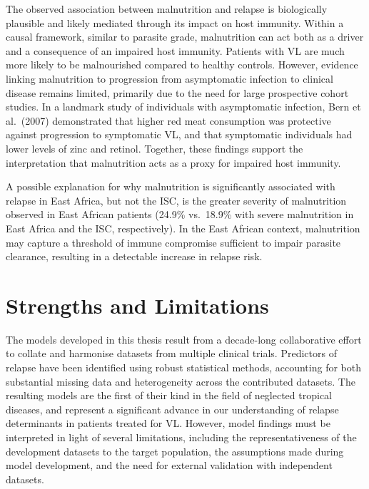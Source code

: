 The observed association between malnutrition and relapse is biologically plausible and likely mediated through its impact on host immunity. Within a causal framework, similar to parasite grade, malnutrition can act both as a driver and a consequence of an impaired host immunity\cite{bourke2016}. Patients with VL are much more likely to be malnourished compared to healthy controls\cite{burza2018,pareyn2025}. However, evidence linking malnutrition to progression from asymptomatic infection to clinical disease remains limited, primarily due to the need for large prospective cohort studies\cite{hirve2016,picado2014}. In a landmark study of individuals with asymptomatic infection, Bern et al.\ (2007) demonstrated that higher red meat consumption was protective against progression to symptomatic VL, and that symptomatic individuals had lower levels of zinc and retinol\cite{bern2007}. Together, these findings support the interpretation that malnutrition acts as a proxy for impaired host immunity.

A possible explanation for why malnutrition is significantly associated with relapse in East Africa, but not the ISC, is the greater severity of malnutrition observed in East African patients (24.9\% vs.\ 18.9\% with severe malnutrition in East Africa and the ISC, respectively). In the East African context, malnutrition may capture a threshold of immune compromise sufficient to impair parasite clearance, resulting in a detectable increase in relapse risk.

\section{Strengths and Limitations}

The models developed in this thesis result from a decade-long collaborative effort to collate and harmonise datasets from multiple clinical trials. Predictors of relapse have been identified using robust statistical methods, accounting for both substantial missing data and heterogeneity across the contributed datasets. The resulting models are the first of their kind in the field of neglected tropical diseases, and represent a significant advance in our understanding of relapse determinants in patients treated for VL. However, model findings must be interpreted in light of several limitations, including the representativeness of the development datasets to the target population, the assumptions made during model development, and the need for external validation with independent datasets.

